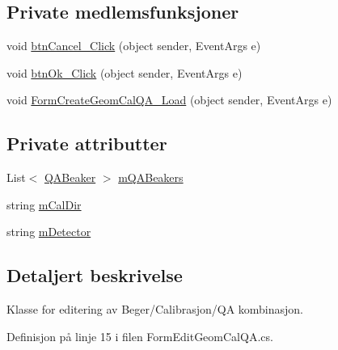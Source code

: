 \subsection*{Private medlemsfunksjoner}
\begin{DoxyCompactItemize}
\item 
void \hyperlink{class_scintilab_1_1_form_edit_geom_cal_q_a_aa137f32dd12572e97282405fc071b5ca}{btn\+Cancel\+\_\+\+Click} (object sender, Event\+Args e)
\item 
void \hyperlink{class_scintilab_1_1_form_edit_geom_cal_q_a_a2eac66e9cc76af16af67f5144e849eba}{btn\+Ok\+\_\+\+Click} (object sender, Event\+Args e)
\item 
void \hyperlink{class_scintilab_1_1_form_edit_geom_cal_q_a_a93cad2b77f9ed31192cae5ec7bba0e1d}{Form\+Create\+Geom\+Cal\+Q\+A\+\_\+\+Load} (object sender, Event\+Args e)
\end{DoxyCompactItemize}
\subsection*{Private attributter}
\begin{DoxyCompactItemize}
\item 
List$<$ \hyperlink{class_scintilab_1_1_q_a_beaker}{Q\+A\+Beaker} $>$ \hyperlink{class_scintilab_1_1_form_edit_geom_cal_q_a_a8465be0742cd30958c2575a537f28ba2}{m\+Q\+A\+Beakers}
\item 
string \hyperlink{class_scintilab_1_1_form_edit_geom_cal_q_a_a3f8a6138f8dc3a87ff3301739f7aad0a}{m\+Cal\+Dir}
\item 
string \hyperlink{class_scintilab_1_1_form_edit_geom_cal_q_a_afadb7ab76847266dd9281e95ac5d3ce4}{m\+Detector}
\end{DoxyCompactItemize}


\subsection{Detaljert beskrivelse}
Klasse for editering av Beger/\+Calibrasjon/\+Q\+A kombinasjon. 

Definisjon på linje 15 i filen Form\+Edit\+Geom\+Cal\+Q\+A.\+cs.



